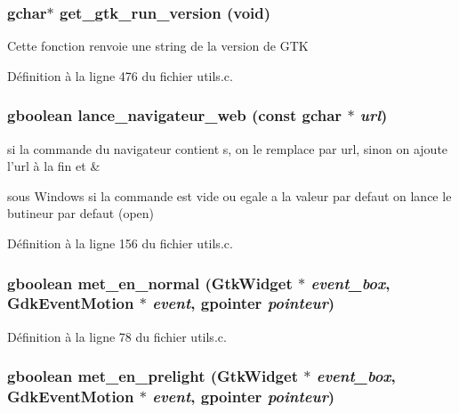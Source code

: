 \subsubsection[{get\_\-gtk\_\-run\_\-version}]{\setlength{\rightskip}{0pt plus 5cm}gchar$\ast$ get\_\-gtk\_\-run\_\-version (void)}\label{utils_8h_ae9b947fc18c3a21dcefe736a902a4926}
Cette fonction renvoie une string de la version de GTK 

Définition à la ligne 476 du fichier utils.c.

\subsubsection[{lance\_\-navigateur\_\-web}]{\setlength{\rightskip}{0pt plus 5cm}gboolean lance\_\-navigateur\_\-web (const gchar $\ast$ {\em url})}\label{utils_8h_ac95e13303adfcd6b449afd319bc040ab}
si la commande du navigateur contient s, on le remplace par url, sinon on ajoute l'url à la fin et \&

sous Windows si la commande est vide ou egale a la valeur par defaut on lance le butineur par defaut (open) 

Définition à la ligne 156 du fichier utils.c.

\subsubsection[{met\_\-en\_\-normal}]{\setlength{\rightskip}{0pt plus 5cm}gboolean met\_\-en\_\-normal (GtkWidget $\ast$ {\em event\_\-box}, \/  GdkEventMotion $\ast$ {\em event}, \/  gpointer {\em pointeur})}\label{utils_8h_ab19e8857d0718043a43d7e4e9256f717}


Définition à la ligne 78 du fichier utils.c.

\subsubsection[{met\_\-en\_\-prelight}]{\setlength{\rightskip}{0pt plus 5cm}gboolean met\_\-en\_\-prelight (GtkWidget $\ast$ {\em event\_\-box}, \/  GdkEventMotion $\ast$ {\em event}, \/  gpointer {\em pointeur})}\label{utils_8h_abd40f595e7f75784d5151abd80a35af7}


